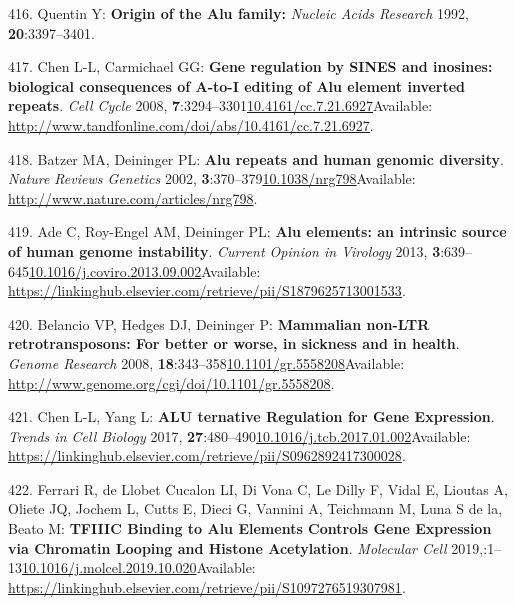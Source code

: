\documentclass[
]{book}
\begin{document}
\leavevmode\hypertarget{ref-Quentin1992}{}%
416. Quentin Y: \textbf{Origin of the Alu family:} \emph{Nucleic Acids Research} 1992, \textbf{20}:3397--3401.

\leavevmode\hypertarget{ref-Chen2008}{}%
417. Chen L-L, Carmichael GG: \textbf{Gene regulation by SINES and inosines: biological consequences of A-to-I editing of Alu element inverted repeats}. \emph{Cell Cycle} 2008, \textbf{7}:3294--3301\href{https://doi.org/10.4161/cc.7.21.6927}{10.4161/cc.7.21.6927}Available: \url{http://www.tandfonline.com/doi/abs/10.4161/cc.7.21.6927}.

\leavevmode\hypertarget{ref-Batzer2002}{}%
418. Batzer MA, Deininger PL: \textbf{Alu repeats and human genomic diversity}. \emph{Nature Reviews Genetics} 2002, \textbf{3}:370--379\href{https://doi.org/10.1038/nrg798}{10.1038/nrg798}Available: \url{http://www.nature.com/articles/nrg798}.

\leavevmode\hypertarget{ref-Ade2013}{}%
419. Ade C, Roy-Engel AM, Deininger PL: \textbf{Alu elements: an intrinsic source of human genome instability}. \emph{Current Opinion in Virology} 2013, \textbf{3}:639--645\href{https://doi.org/10.1016/j.coviro.2013.09.002}{10.1016/j.coviro.2013.09.002}Available: \url{https://linkinghub.elsevier.com/retrieve/pii/S1879625713001533}.

\leavevmode\hypertarget{ref-Belancio2008}{}%
420. Belancio VP, Hedges DJ, Deininger P: \textbf{Mammalian non-LTR retrotransposons: For better or worse, in sickness and in health}. \emph{Genome Research} 2008, \textbf{18}:343--358\href{https://doi.org/10.1101/gr.5558208}{10.1101/gr.5558208}Available: \url{http://www.genome.org/cgi/doi/10.1101/gr.5558208}.

\leavevmode\hypertarget{ref-Chen2017b}{}%
421. Chen L-L, Yang L: \textbf{ALU ternative Regulation for Gene Expression}. \emph{Trends in Cell Biology} 2017, \textbf{27}:480--490\href{https://doi.org/10.1016/j.tcb.2017.01.002}{10.1016/j.tcb.2017.01.002}Available: \url{https://linkinghub.elsevier.com/retrieve/pii/S0962892417300028}.

\leavevmode\hypertarget{ref-RobertoFerrari2019}{}%
422. Ferrari R, de Llobet Cucalon LI, Di Vona C, Le Dilly F, Vidal E, Lioutas A, Oliete JQ, Jochem L, Cutts E, Dieci G, Vannini A, Teichmann M, Luna S de la, Beato M: \textbf{TFIIIC Binding to Alu Elements Controls Gene Expression via Chromatin Looping and Histone Acetylation}. \emph{Molecular Cell} 2019,:1--13\href{https://doi.org/10.1016/j.molcel.2019.10.020}{10.1016/j.molcel.2019.10.020}Available: \url{https://linkinghub.elsevier.com/retrieve/pii/S1097276519307981}.
\end{document}
